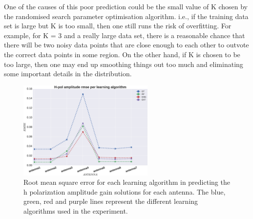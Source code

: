 One of the causes of this poor prediction could be the small value of K chosen by the randomised search parameter optimisation algorithm. i.e., if the training data set is large but K is too small, then one still runs the risk of overfitting. For example, for K = 3 and a really large data set, there is a reasonable chance that there will be two noisy data points that are close enough to each other to outvote the correct data points in some region. On the other hand, if K is chosen to be too large, then one may end up smoothing things out too much and eliminating some important details in the distribution. 
\begin{figure}[H]
  \centering
    \includegraphics[width=0.6\textwidth]{images/Hpol-amp.eps}
    \caption{Root mean square error for each learning algorithm in predicting the h polarization amplitude gain solutions for each antenna. The blue, green, red and purple lines represent the different learning algorithms used in the experiment.}
  \label{amprm}
 \end{figure} 

